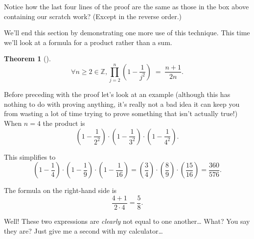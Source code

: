 \documentclass[10pt,]{book}
\theoremstyle{plain}
\newtheorem{theorem}{Theorem}[section]
\theoremstyle{definition}
\theoremstyle{definition}
\numberwithin{equation}{section}
\newcommand{\Integers}{{\mathbb Z}}
\begin{document}
    Notice how the last four lines of the proof are the same as those in
    the box above containing our scratch work? (Except in the reverse order.)
\par

    We'll end this section by demonstrating one more use of this technique.
    This time we'll look at a formula for a product rather than a sum.
\begin{theorem}[{}]\label{theorem-18}
\begin{equation*}
        \forall n \geq 2 \in \Integers, \prod_{j=2}^n \left( 1 - \frac{1}{j^2} \right) \;  = \; \frac{n+1}{2n}.
      \end{equation*}\end{theorem}
\par

    Before preceding with the proof let's look at an example (although this
    has nothing to do with proving anything, it's really not a bad idea \textemdash{} it can
    keep you from wasting a lot of time trying to prove something that isn't
    actually true!) When \(n = 4\) the product is
    \begin{equation*}
      \left(1-\frac{1}{2^2}\right) \cdot \left(1-\frac{1}{3^2}\right) \cdot \left(1-\frac{1}{4^2}\right).
    \end{equation*}
\par

    This simplifies to
    \begin{equation*}
      \left( 1-\frac{1}{4} \right) \cdot \left( 1-\frac{1}{9} \right) \cdot 
      \left( 1-\frac{1}{16} \right)  =  \left( \frac{3}{4} \right) \cdot \left( \frac{8}{9} \right) \cdot \left( \frac{15}{16} \right)  =  \frac{360}{576}.
    \end{equation*}
\par

    The formula on the right-hand side is
    \begin{equation*}
      \frac{4+1}{2 \cdot 4}  = \frac{5}{8}.
    \end{equation*}
\par

    Well! These two expressions are \emph{clearly} not equal to one another\dots{}
    What? You say they are? Just give me a second with my calculator\dots{}
\par
\end{document}
